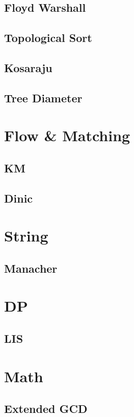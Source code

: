     \subsection{Floyd Warshall}
        
    \subsection{Topological Sort}
        
    \subsection{Kosaraju}
        
    \subsection{Tree Diameter}
        

\section{Flow \& Matching}
    \subsection{KM}
        
    \subsection{Dinic}
        

\section{String}
    \subsection{Manacher}
        

\section{DP}
    \subsection{LIS}
        

\section{Math}
    \subsection{Extended GCD}
        